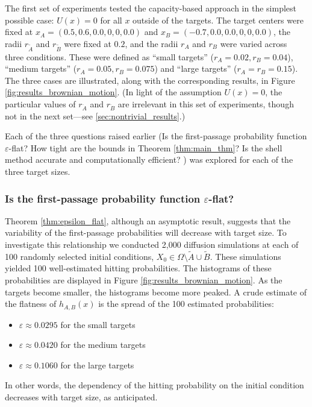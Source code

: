 \documentclass[12pt, nofootinbib,english, amsmath, amssymb, aps, priprint, graphicx,floatfix]{revtex4-1}
\theoremstyle{plain}
\theoremstyle{definition}
\theoremstyle{plain}
\newcommand{\dA}{{\dot A}}
\newcommand{\tA}{{\tilde A}}
\newcommand{\dB}{{\dot B}}
\newcommand{\tB}{{\tilde B}}
\begin{document}
The first set of experiments tested the capacity-based approach in the simplest possible case: $U(x)=0$ for all $x$ outside of the targets. The target centers were fixed
at $x_A=(0.5,0.6,0.0,0,0,0.0)$ and $x_B=(-0.7,0.0,0.0,0,0,0.0)$, the radii $r_\tA$ and $r_\tB$ were fixed at $0.2$, 
and the radii $r_A$ and $r_B$ were varied across three conditions. These were defined as ``small targets'' ($r_A=0.02, r_B=0.04$), ``medium targets'' ($r_A=0.05, r_B=0.075$) and ``large targets'' ($r_A=r_B=0.15$). 
The three cases are illustrated, along with the corresponding results, in Figure \ref{fig:results_brownian_motion}.  
(In light of the assumption $U(x)=0$, the particular values of
$r_\dA$ and $r_\dB$ 
are irrelevant in this set of experiments, though not in the next set---see \ref{sec:nontrivial_results}.)

Each of the three questions raised earlier 
(Is the first-passage probability function 
 $\varepsilon$-flat?
 How tight are the bounds in Theorem \ref{thm:main_thm}? 
 Is the shell method accurate and computationally efficient? )
was explored for each of the three target sizes.  

\subsubsection{Is the first-passage probability function 
 $\varepsilon$-flat?}
\label{sec:toy_constant}
Theorem \ref{thm:epsilon_flat}, although an asymptotic result, suggests that the variability of the first-passage probabilities will decrease with target size. 
To investigate this relationship we conducted 2,000 diffusion simulations at each of 100 randomly selected initial conditions,
$X_0 \in \Omega\setminus \tA \cup \tB$.  These simulations yielded 100 well-estimated hitting probabilities.  The histograms of these probabilities are displayed in Figure \ref{fig:results_brownian_motion}.  As the targets become smaller, the histograms become more peaked.  
A crude estimate of the flatness of $h_{A,B}(x)$ is the 
spread of the 100 estimated probabilities:
\begin{itemize}
    \item $\varepsilon\approx 0.0295$ for the small targets
    \item $\varepsilon\approx 0.0420$ for the medium targets
    \item $\varepsilon\approx 0.1060$ for the large targets
\end{itemize}
In other words, the dependency of the hitting probability on the initial condition decreases with target size, as anticipated.
\end{document}
